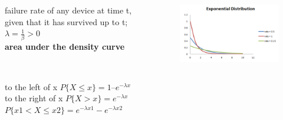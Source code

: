 \documentclass{beamer}
\begin{document}
\begin{frame}%
	\begin{columns}
		\begin{column}{0.45\textwidth}
			failure rate of any device at time t, given that it has survived up to t; $\lambda = \frac{1}{\beta} > 0 $
			\\ 
			\textbf{area under the density curve}
		\end{column}
		\begin{column}{0.5\textwidth}
			\begin{figure}
				\includegraphics[scale=0.5]{exponential}
			\end{figure}
		\end{column}
	\end{columns}
			to the left of x
			 $P\{X \leq x\} = 1 – e^{-\lambda x}$
			\\ to the right of x $P\{X > x\} = e^{-\lambda x}$
			\\
			$P\{x1 < X \leq x2\} = e^{-\lambda x1} - e^{-\lambda x2}$

\end{frame}
\end{document}
